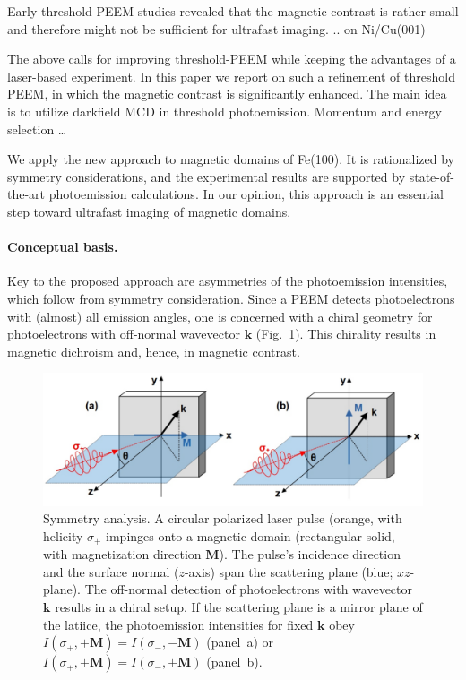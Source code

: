 \documentclass[prl,twocolumn,floatfix]{revtex4-2}
\renewcommand{\vec}[1]{\boldsymbol{#1}}
\begin{document}
Early threshold PEEM studies revealed that the magnetic contrast is rather small and therefore might not be sufficient for ultrafast imaging.  .. on Ni/Cu(001) 

The above calls for improving threshold-PEEM while keeping the advantages of a laser-based experiment. In this paper we report on such a refinement of threshold PEEM, in which the magnetic contrast is significantly enhanced. The main idea is to utilize darkfield MCD in threshold photoemission. Momentum and energy selection \ldots 

We apply the new approach to magnetic domains of Fe(100). It is rationalized by symmetry considerations, and the experimental results are supported by state-of-the-art photoemission calculations. In our opinion, this approach is an essential step toward ultrafast imaging of magnetic domains.

\paragraph{Conceptual basis.} Key to the proposed approach are asymmetries of the photoemission intensities, which follow from  symmetry consideration. Since a PEEM detects photoelectrons with (almost) all emission angles, one is concerned with a chiral geometry for photoelectrons with off-normal wavevector $\vec{k}$ (Fig.~\ref{fig:symmetry}). This chirality results in magnetic dichroism and, hence, in magnetic contrast.

\begin{figure}
    \centering
    \includegraphics[width = \columnwidth]{symmetry}
    \caption{Symmetry analysis. A circular polarized laser pulse (orange, with helicity $\sigma_{+}$ impinges onto a magnetic domain (rectangular solid, with magnetization direction $\vec{M}$). The pulse's incidence direction and the surface normal ($z$-axis) span the scattering plane (blue; $xz$-plane). The off-normal detection of photoelectrons with wavevector $\vec{k}$ results in a chiral setup. If the scattering plane is a mirror plane of the latiice, the photoemission intensities for fixed $\vec{k}$ obey $I(\sigma_{+}, +\vec{M}) = I(\sigma_{-}, -\vec{M})$ (panel~a) or $I(\sigma_{+}, +\vec{M}) = I(\sigma_{-}, +\vec{M})$ (panel~b).}
    \label{fig:symmetry}
\end{figure}
\end{document}
